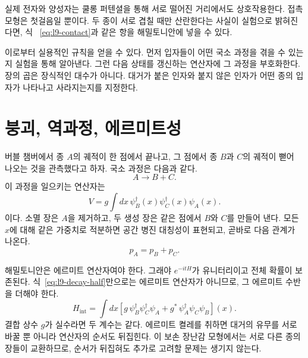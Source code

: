 실제 전자와 양성자는 쿨롱 퍼텐셜을 통해 서로 떨어진 거리에서도 상호작용한다. 접촉 모형은 첫걸음일 뿐이다. 두 종이 서로 겹칠 때만 산란한다는 사실이 실험으로 밝혀진다면, 식 ~\eqref{eq:l9-contact}과 같은 항을 해밀토니안에 넣을 수 있다.

\begin{classroomqa}\end{classroomqa}

이로부터 실용적인 규칙을 얻을 수 있다. 먼저 입자들이 어떤 국소 과정을 겪을 수 있는지 실험을 통해 알아낸다. 그런 다음 상태를 갱신하는 연산자에 그 과정을 부호화한다. 장의 곱은 장식적인 대수가 아니다. 대거가 붙은 인자와 붙지 않은 인자가 어떤 종의 입자가 나타나고 사라지는지를 지정한다.

\section{붕괴, 역과정, 에르미트성}

버블 챔버에서 종 \(A\)의 궤적이 한 점에서 끝나고, 그 점에서 종 \(B\)과 \(C\)의 궤적이 뻗어 나오는 것을 관측했다고 하자. 국소 과정은 다음과 같다.
\begin{equation}
A\longrightarrow B+C.
\end{equation}
이 과정을 일으키는 연산자는
\begin{equation}
V=g\int dx\,
\psi_B^\dagger(x)\psi_C^\dagger(x)\psi_A(x).
\label{eq:l9-decay-half}
\end{equation}
이다. 소멸 장은 \(A\)을 제거하고, 두 생성 장은 같은 점에서 \(B\)와 \(C\)를 만들어 낸다. 모든 \(x\)에 대해 같은 가중치로 적분하면 공간 병진 대칭성이 표현되고, 곧바로 다음 관계가 나온다.
\begin{equation}
p_A=p_B+p_C.
\end{equation}

해밀토니안은 에르미트 연산자여야 한다. 그래야 \(e^{-itH}\)가 유니터리이고 전체 확률이 보존된다. 식~\eqref{eq:l9-decay-half}만으로는 에르미트 연산자가 아니므로, 그 에르미트 수반을 더해야 한다.
\begin{equation}
H_{\mathrm{int}}
=\int dx\left[
g\,\psi_B^\dagger\psi_C^\dagger\psi_A
+g^*\,\psi_A^\dagger\psi_C\psi_B
\right](x).
\label{eq:l9-hermitian-vertex}
\end{equation}
결합 상수 \(g\)가 실수라면 두 계수는 같다. 에르미트 켤레를 취하면 대거의 유무를 서로 바꿀 뿐 아니라 연산자의 순서도 뒤집힌다. 이 보손 장난감 모형에서는 서로 다른 종의 장들이 교환하므로, 순서가 뒤집혀도 추가로 고려할 문제는 생기지 않는다.

